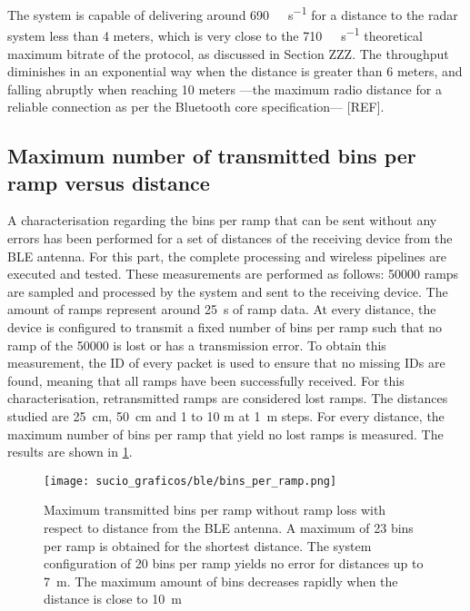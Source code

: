 The system is capable of delivering around \SI{690}{\kilo\bit\per\second} for a distance to the radar system less than 4 meters, which is very close to the \SI{710}{\kilo\bit\per\second} theoretical maximum bitrate of the protocol, as discussed in Section ZZZ. The throughput diminishes in an exponential way when the distance is greater than 6 meters, and falling abruptly when reaching 10 meters ---the maximum radio distance for a reliable connection as per the Bluetooth core specification--- [REF].

\subsection{Maximum number of transmitted bins per ramp versus distance} \label{sec:max_number_bins_vs_distance}

A characterisation regarding the bins per ramp that can be sent without any errors has been performed for a set of distances of the receiving device from the BLE antenna. For this part, the complete processing and wireless pipelines are executed and tested. These measurements are performed as follows: 50000 ramps are sampled and processed by the system and sent to the receiving device. The amount of ramps represent around \SI{25}{\second} of ramp data. At every distance, the device is configured to transmit a fixed number of bins per ramp such that no ramp of the 50000 is lost or has a transmission error. To obtain this measurement, the ID of every packet is used to ensure that no missing IDs are found, meaning that all ramps have been successfully received. For this characterisation, retransmitted ramps are considered lost ramps. The distances studied are \SI{25}{\centi\metre}, \SI{50}{\centi\metre} and 1 to 10 \si{\metre} at \SI{1}{\metre} steps. For every distance, the maximum number of bins per ramp that yield no lost ramps is measured. The results are shown in \cref{fig:firmware_ble_char_bins}.

\begin{figure}[ht]
	\centering
	\texttt{[image: sucio\_graficos/ble/bins\_per\_ramp.png]}
	\caption{Maximum transmitted bins per ramp without ramp loss with respect to distance from the BLE antenna. A maximum of 23 bins per ramp is obtained for the shortest distance. The system configuration of 20 bins per ramp yields no error for distances up to \SI{7}{\metre}. The maximum amount of bins decreases rapidly when the distance is close to \SI{10}{\metre}
	\label{fig:firmware_ble_char_bins}}
\end{figure}

